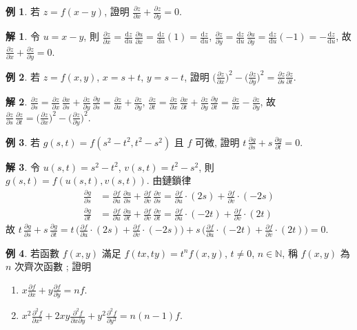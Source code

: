 \documentclass[12pt]{extarticle}
\newcommand{\ds}{\displaystyle}
\theoremstyle{definition}
\newtheorem*{ex}{例}
\newtheorem*{sol}{解}
\newcommand{\pdiff}[2]{\frac{\partial #1}{\partial #2}}
\newcommand{\pdifft}[2]{\frac{\partial^2 #1}{\partial #2^2}}
\newcommand{\diff}[2]{\frac{\mathrm{d} #1}{\mathrm{d} #2}}
\begin{document}
\begin{ex}
  若 $\ds z = f(x - y)$, 證明 $\ds\pdiff{z}{x} + \pdiff{z}{y} = 0$. 
\end{ex}

\begin{sol} 令 $\ds u = x - y$, 則 $\ds\pdiff{z}{x} = \diff{z}{u}\,\pdiff{u}{x} = \diff{z}{u}(1) = \diff{z}{u}$, $\ds\pdiff{z}{y} = \diff{z}{u}\,\pdiff{u}{y} = \diff{z}{u}(-1) = -\diff{z}{u}$, 故 $\ds\pdiff{z}{x} + \pdiff{z}{y} = 0$. 
\end{sol}

\begin{ex}
  若 $\ds z = f(x, y)$, $\ds x = s + t$, $\ds y = s - t$, 證明 $\ds\bigg(\pdiff{z}{x}\bigg)^2 - \bigg(\pdiff{z}{y}\bigg)^2 = \pdiff{z}{s}\pdiff{z}{t}$. 
\end{ex}

\begin{sol} 
  $\ds\pdiff{z}{s} = \pdiff{z}{x}\,\pdiff{x}{s} + \pdiff{z}{y}\,\pdiff{y}{s} = \pdiff{z}{x} + \pdiff{z}{y}$, $\ds\pdiff{z}{t} = \pdiff{z}{x}\,\pdiff{x}{t} + \pdiff{z}{y}\,\pdiff{y}{t} = \pdiff{z}{x} - \pdiff{z}{y}$, 故 $\ds\pdiff{z}{s}\,\pdiff{z}{t} = \bigg(\pdiff{z}{x}\bigg)^2 - \bigg(\pdiff{z}{y}\bigg)^2$. 
\end{sol}

\begin{ex}
  若 $\ds g(s, t) = f(s^2 - t^2, t^2 - s^2)$ 且 $f$ 可微, 證明 $\ds t\,\pdiff{g}{s} + s\,\pdiff{g}{t} = 0$. 
\end{ex}

\begin{sol}
  令 $\ds u(s, t) = s^2 - t^2$, $\ds v(s, t) = t^2 - s^2$, 則 $\ds g(s, t) = f(u(s, t), v(s, t))$. 由鏈鎖律 
  \begin{align*}
    \pdiff{g}{s} &= \pdiff{f}{u}\,\pdiff{u}{s} + \pdiff{f}{v}\,\pdiff{v}{s} = \pdiff{f}{u}\cdot(2s) + \pdiff{f}{v}\cdot(-2s) \\
    \pdiff{g}{t} &= \pdiff{f}{u}\,\pdiff{u}{t} + \pdiff{f}{v}\,\pdiff{v}{t} = \pdiff{f}{u}\cdot(-2t) + \pdiff{f}{v}\cdot(2t)
  \end{align*}
  故 $\ds t\,\pdiff{g}{s} + s\,\pdiff{g}{t} = t\,\bigg(\pdiff{f}{u}\cdot(2s) + \pdiff{f}{v}\cdot(-2s)\bigg) + s\,\bigg(\pdiff{f}{u}\cdot(-2t) + \pdiff{f}{v}\cdot(2t)\bigg) = 0$.  
\end{sol}

\begin{ex}
  若函數 $f(x, y)$ 滿足 $\ds f(tx, ty) = t^n f(x, y)$, $t\ne 0$, $n\in\mathbb{N}$, 稱 $f(x, y)$ 為 $n$ 次齊次函數%
; 證明
  \begin{multicols}{2}
    \begin{enumerate}\setlength{\itemsep}{0pt}
      \item $\ds x\pdiff{f}{x} + y\pdiff{f}{y} = nf$.
      \item $\ds x^2\pdifft{f}{x} + 2xy\frac{\partial^2 f}{\partial x\partial y} + y^2\pdifft{f}{y} = n(n - 1)f$.
    \end{enumerate}
  \end{multicols}
\end{ex}
\end{document}
